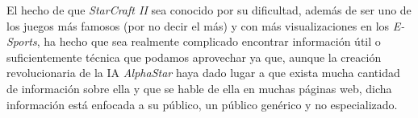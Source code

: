 \documentclass[a4paper,10pt]{report}
\begin{document}
    El hecho de que \textit{StarCraft II} sea conocido por su dificultad, además de ser uno de los juegos más famosos (por no decir el más) y con más visualizaciones en los \textit{E-Sports}, ha hecho que sea realmente complicado encontrar información útil o suficientemente técnica que podamos aprovechar ya que, aunque la creación revolucionaria de la IA \textit{AlphaStar} haya dado lugar a que exista mucha cantidad de información sobre ella y que se hable de ella en muchas páginas web, dicha información está enfocada a su público, un público genérico y no especializado.\\
\end{document}
